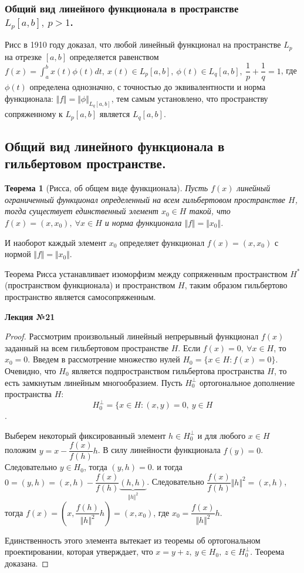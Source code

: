 \documentclass[14pt,a4paper]{extarticle}
\newtheorem{theorem}{Теорема}[section]
\theoremstyle{definition}
\theoremstyle{remark}
\renewcommand{\[}{\begin{dmath*}[compact]}
\renewcommand{\]}{\end{dmath*}}
\newcommand{\ds}{\displaystyle}
\newcommand{\sep}{ , \ \allowbreak }
\newcommand\f[2]{\dfrac{#1}{#2}}
\begin{document}
\subsubsection{Общий вид линейного функционала в пространстве
$L_p[a,b] \sep p > 1$.}

Рисс в 1910 году доказал, что любой линейный функционал на
пространстве $L_p$ на отрезке $[a,b]$ определяется равенством
$\ds f(x) = \int_a^b x(t) \phi(t) dt \sep x(t) \in L_p[a,b] \sep
\phi(t) \in L_q[a,b] \sep \f{1}p+\f{1}q=1$, где $\phi(t)$ определена однозначно,
с точностью до эквивалентности и норма функционала:
$\Vert f \Vert = \Vert \phi \Vert_{L_q[a,b]}$,
тем самым установлено, что пространству сопряженному к $L_p[a,b]$
является $L_q[a,b]$.

\subsection{Общий вид линейного функционала в гильбертовом пространстве.}

\begin{theorem}[Рисса, об общем виде функционала]
  Пусть $f(x)$ линейный ограниченный функционал определенный на всем
  гильбертовом пространстве $H$, тогда существует единственный элемент
  $x_0 \in H$ такой, что $f(x)=(x,x_0) \sep \forall x \in H$
  и норма функционала $\Vert f \Vert = \Vert x_0 \Vert$.
\end{theorem}

И наоборот каждый элемент $x_0$ определяет функционал $f(x)=(x,x_0)$ с нормой
$\Vert f \Vert = \Vert x_0 \Vert$.

Теорема Рисса устанавливает изоморфизм между сопряженным пространством $H^*$
(пространством функционала) и пространством $H$,
таким образом гильбертово пространство является самосопряженным.

\textbf{Лекция №21}

\begin{proof}
  Рассмотрим произвольный линейный непрерывный функционал $f(x)$
  заданный на всем гильбертовом пространстве $H$.
  Если $f(x)=0 \sep \forall x \in H$, то $x_0=0$.
  Введем в рассмотрение множество нулей $H_0 = \{x \in H : f(x) = 0\}$.
  Очевидно, что $H_0$ является подпространством гильбертова пространства $H$,
  то есть замкнутым линейным многообразием.
  Пусть $H_0^\bot$ ортогональное дополнение пространства $H$:
  \[H_0^\bot = \{x \in H: (x,y)=0 \sep y \in H\].

  Выберем некоторый фиксированный элемент $h \in H_0^\bot$
  и для любого $x \in H$ положим $y=x- \f{f(x)}{f(h)}h$.
  В силу линейности функционала $f(y)=0$.
  Следовательно $y \in H_0$, тогда $(y,h)=0$.
  и тогда $0=(y,h)=(x,h)-\f{f(x)}{f(h)}\underbrace{(h,h)}_{\Vert h \Vert ^2}$.
  Следовательно $\f{f(x)}{f(h)} \Vert h \Vert ^2 = (x,h)$,
  тогда $f(x)= (x,\f{f(h)}{\Vert h \Vert ^2} h)=(x,x_0)$,
  где $x_0=\f{f(x)}{\Vert h \Vert^2}h$.

  Единственность этого элемента вытекает из теоремы об ортогональном
  проектировании, которая утверждает, что
  $x=y+z \sep y \in H_0 \sep z \in H_0^\bot$.
  Теорема доказана.
\end{proof}
\end{document}
